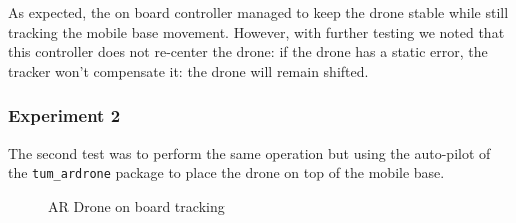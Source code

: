 \documentclass[11pt,a4paper]{article}
\begin{document}
As expected, the on board controller managed to keep the drone stable while still tracking the mobile base 
movement.  However, with further testing we noted that this controller does not re-center the drone: if the drone has a static
error, the tracker won't compensate it: the drone will remain shifted.

\subsubsection{Experiment 2}
The second test was to perform the same operation but using the auto-pilot of the \verb!tum_ardrone!
package to place the drone on top of the mobile base.

\begin{figure}[ht!]%
	\centering
    \qquad  
    \qquad  
    \qquad  
    \qquad  
    \caption{AR Drone on board tracking}
    \label{fig:exp2}
\end{figure}
\end{document}
